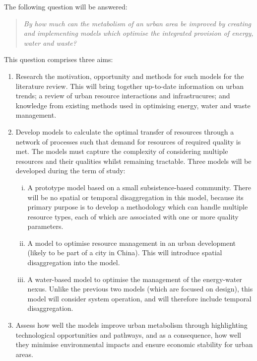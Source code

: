 The following question will be answered:
\begin{quote}
	\emph{By how much can the metabolism of an urban area be improved by creating and implementing models which optimise the integrated provision of energy, water and waste?}
\end{quote}
This question comprises three aims:
\begin{enumerate}
	\item Research the motivation, opportunity and methods for such models for the literature review. This will bring together up-to-date information on urban trends; a review of urban resource interactions and infrastrucures; and knowledge from existing methods used in optimising energy, water and waste management.
	\item Develop models to calculate the optimal transfer of resources through a network of processes such that demand for resources of required quality is met. The models must capture the complexity of considering multiple resources and their qualities whilst remaining tractable. Three models will be developed during the term of study:
		\begin{enumerate}[(i)]
			\item A prototype model based on a small subsistence-based community. There will be no spatial or temporal disaggregation in this model, because its primary purpose is to develop a methodology which can handle multiple resource types, each of which are associated with one or more quality parameters.
			\item A model to optimise resource management in an urban development (likely to be part of a city in China). This will introduce spatial disaggregation into the model.
			\item A water-based model to optimise the management of the energy-water nexus. Unlike the previous two models (which are focused on design), this model will consider system operation, and will therefore include temporal disaggregation.
		\end{enumerate}
	\item Assess how well the models improve urban metabolism through highlighting technological opportunities and pathways, and as a consequence, how well they minimise environmental impacts and ensure economic stability for urban areas.
\end{enumerate}

